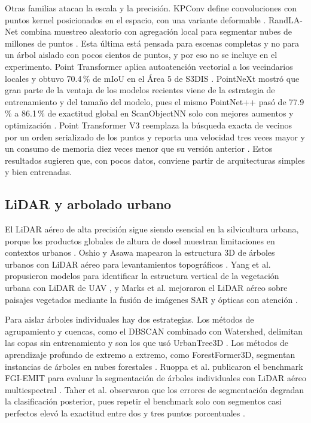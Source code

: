 \documentclass[preprint,12pt]{elsarticle}
\begin{document}
Otras familias atacan la escala y la precisión. KPConv define convoluciones con puntos kernel posicionados en el espacio, con una variante deformable \cite{thomas2019kpconv}. RandLA-Net combina muestreo aleatorio con agregación local para segmentar nubes de millones de puntos \cite{hu2020randla}. Esta última está pensada para escenas completas y no para un árbol aislado con pocos cientos de puntos, y por eso no se incluye en el experimento. Point Transformer aplica autoatención vectorial a los vecindarios locales y obtuvo 70.4\,\% de mIoU en el Área 5 de S3DIS \cite{zhao2021pointtransformer}. PointNeXt mostró que gran parte de la ventaja de los modelos recientes viene de la estrategia de entrenamiento y del tamaño del modelo, pues el mismo PointNet++ pasó de 77.9\,\% a 86.1\,\% de exactitud global en ScanObjectNN solo con mejores aumentos y optimización \cite{qian2022pointnext}. Point Transformer V3 reemplaza la búsqueda exacta de vecinos por un orden serializado de los puntos y reporta una velocidad tres veces mayor y un consumo de memoria diez veces menor que su versión anterior \cite{wu2024ptv3}. Estos resultados sugieren que, con pocos datos, conviene partir de arquitecturas simples y bien entrenadas.

\subsection{LiDAR y arbolado urbano}

El LiDAR aéreo de alta precisión sigue siendo esencial en la silvicultura urbana, porque los productos globales de altura de dosel muestran limitaciones en contextos urbanos \cite{dong2025highprecision}. Oshio y Asawa mapearon la estructura 3D de árboles urbanos con LiDAR aéreo para levantamientos topográficos \cite{oshio2024mapping}. Yang et al. propusieron modelos para identificar la estructura vertical de la vegetación urbana con LiDAR de UAV \cite{yang2026vertical}, y Marks et al. mejoraron el LiDAR aéreo sobre paisajes vegetados mediante la fusión de imágenes SAR y ópticas con atención \cite{marks2025attention}.

Para aislar árboles individuales hay dos estrategias. Los métodos de agrupamiento y cuencas, como el DBSCAN \cite{ester1996dbscan} combinado con Watershed, delimitan las copas sin entrenamiento y son los que usó UrbanTree3D \cite{hamdani2026hybrid}. Los métodos de aprendizaje profundo de extremo a extremo, como ForestFormer3D, segmentan instancias de árboles en nubes forestales \cite{xiang2025forestformer3d}. Ruoppa et al. publicaron el benchmark FGI-EMIT para evaluar la segmentación de árboles individuales con LiDAR aéreo multiespectral \cite{ruoppa2025fgiemit}. Taher et al. observaron que los errores de segmentación degradan la clasificación posterior, pues repetir el benchmark solo con segmentos casi perfectos elevó la exactitud entre dos y tres puntos porcentuales \cite{taher2025msals}.
\end{document}
